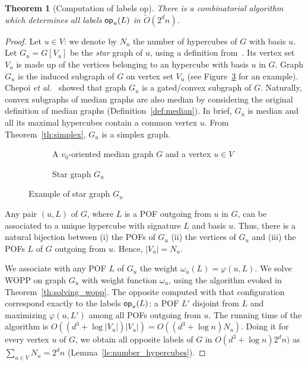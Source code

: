 \documentclass{article}
\newtheorem{theorem}{Theorem}
\newcommand{\card}[1]{\left| #1 \right|}
\newcommand{\opp}{\mbox{\textsf{op}}}
\begin{document}
\begin{theorem}[Computation of labels \opp]
There is a combinatorial algorithm which determines all labels $\opp_u(L)$ in $\tilde{O}(2^dn)$. 
\label{th:compute_opp}
\end{theorem}
\begin{proof}
Let $u \in V$: we denote by $N_u$ the number of hypercubes of $G$ with basis $u$. Let $G_u =  G\left[V_u\right]$ be the \textit{star} graph of $u$, using a definition from~\cite{ChLaRa19}. Its vertex set $V_u$ is made up of the vertices belonging to an hypercube with basis $u$ in $G$. Graph $G_u$ is the induced subgraph of $G$ on vertex set $V_u$ (see Figure~\ref{fig:compute_opposites} for an example). Chepoi {\em et al.}~\cite{ChLaRa19} showed that graph $G_u$ is a gated/convex subgraph of $G$. Naturally, convex subgraphs of median graphs are also median by considering the original definition of median graphs (Definition~\ref{def:median}). In brief, $G_u$ is median and all its maximal hypercubes contain a common vertex $u$. From Theorem~\ref{th:simplex}, $G_u$ is a simplex graph.

\begin{figure}[h]
\centering
\begin{subfigure}[b]{0.54\columnwidth}
\centering
\scalebox{0.8}{}
\caption{A $v_0$-oriented median graph $G$ and a vertex $u \in V$}
\label{subfig:compute_opposites_1}
\end{subfigure}
\begin{subfigure}[b]{0.44\columnwidth}
\centering
\scalebox{0.8}{}
\caption{Star graph $G_u$}
\label{subfig:compute_opposites_2}
\end{subfigure}

\caption{Example of star graph $G_u$}
\label{fig:compute_opposites}
\end{figure}

Any pair $(u,L)$ of $G$, where $L$ is a POF outgoing from $u$ in $G$, can be associated to a unique hypercube with signature $L$ and basis $u$. Thus, there is a natural bijection between (i) the POFs of $G_u$ (ii) the vertices of $G_u$ and (iii) the POFs $L$ of $G$ outgoing from $u$. Hence, $\card{V_u} = N_u$.

We associate with any POF $L$ of $G_u$ the weight $\omega_u(L) = \varphi(u,L)$. We solve WOPP on graph $G_u$ with weight function $\omega_u$, using the algorithm evoked in Theorem~\ref{th:solving_wopp}. The opposite computed with that configuration correspond exactly to the labels $\opp_u(L)$: a POF $L'$ disjoint from $L$ and maximizing $\varphi(u,L')$ among all POFs outgoing from $u$. The running time of the algorithm is $O((d^3+\log \card{V_u})\card{V_u}) = O((d^3+\log n)N_u)$. Doing it for every vertex $u$ of $G$, we obtain all opposite labels of $G$ in $O(d^3+\log n)2^dn)$ as $\sum_{u \in V} N_u = 2^dn$ (Lemma~\ref{le:number_hypercubes}).
\end{proof}
\end{document}
